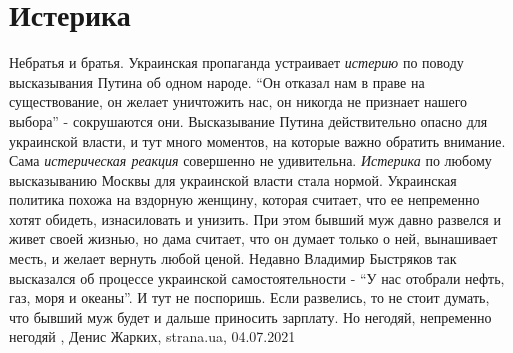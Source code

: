  
 
 
 
 
\chapter{Истерика}
\label{sec:slova.isterika}

Небратья и братья.
Украинская пропаганда устраивает \emph{истерию} по поводу высказывания Путина об одном
народе. \enquote{Он отказал нам в праве на существование, он желает уничтожить нас, он
никогда не признает нашего выбора} - сокрушаются они. Высказывание Путина
действительно опасно для украинской власти, и тут много моментов, на которые
важно обратить внимание.
Сама \emph{истерическая реакция} совершенно не удивительна. \emph{Истерика} по любому
высказыванию Москвы для украинской власти стала нормой. Украинская политика
похожа на вздорную женщину, которая считает, что ее непременно хотят обидеть,
изнасиловать и унизить. При этом бывший муж давно развелся и живет своей
жизнью, но дама считает, что он думает только о ней, вынашивает месть, и желает
вернуть любой ценой. Недавно Владимир Быстряков так высказался об процессе
украинской самостоятельности - \enquote{У нас отобрали нефть, газ, моря и океаны}. И
тут не поспоришь. Если развелись, то не стоит думать, что бывший муж будет и
дальше приносить зарплату. Но негодяй, непременно негодяй
, 
Денис Жарких, strana.ua, 04.07.2021

